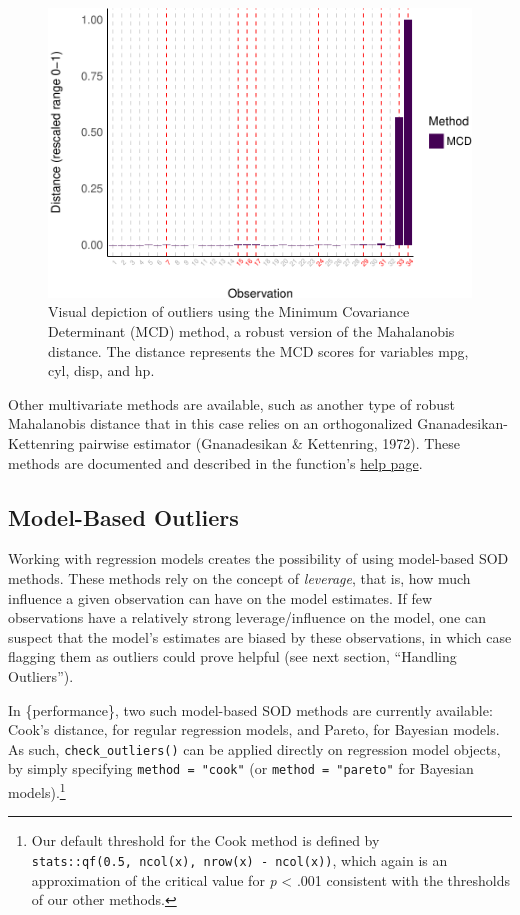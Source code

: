 \documentclass{article}
\begin{document}
\begin{figure}
\includegraphics[width=1\linewidth]{paper_files/figure-latex/multivariate_implicit-1} \caption{Visual depiction of outliers using the Minimum Covariance Determinant (MCD) method, a robust version of the Mahalanobis distance. The distance represents the MCD scores for variables mpg, cyl, disp, and hp.}\label{fig:multivariate_implicit}
\end{figure}

Other multivariate methods are available, such as another type of robust
Mahalanobis distance that in this case relies on an orthogonalized
Gnanadesikan-Kettenring pairwise estimator (Gnanadesikan \& Kettenring,
1972). These methods are documented and described in the function's
\href{https://easystats.github.io/performance/reference/check_outliers.html}{help
page}.

\hypertarget{model-based-outliers}{%
\subsection{Model-Based Outliers}\label{model-based-outliers}}

Working with regression models creates the possibility of using
model-based SOD methods. These methods rely on the concept of
\emph{leverage}, that is, how much influence a given observation can
have on the model estimates. If few observations have a relatively
strong leverage/influence on the model, one can suspect that the model's
estimates are biased by these observations, in which case flagging them
as outliers could prove helpful (see next section, ``Handling
Outliers'').

In \{performance\}, two such model-based SOD methods are currently
available: Cook's distance, for regular regression models, and Pareto,
for Bayesian models. As such, \texttt{check\_outliers()} can be applied
directly on regression model objects, by simply specifying
\texttt{method\ =\ "cook"} (or \texttt{method\ =\ "pareto"} for Bayesian
models).\footnote{Our default threshold for the Cook method is defined
  by \texttt{stats::qf(0.5,\ ncol(x),\ nrow(x)\ -\ ncol(x))}, which
  again is an approximation of the critical value for \emph{p}
  \textless{} .001 consistent with the thresholds of our other methods.}
\end{document}

